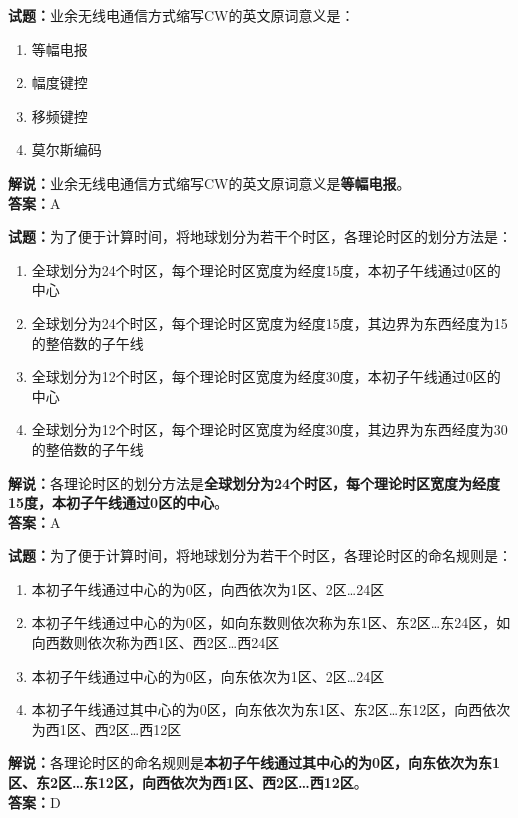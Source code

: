 \documentclass{ctexbook}
\begin{document}
\bigskip


\noindent\textbf{试题：}业余无线电通信方式缩写CW的英文原词意义是：
\begin{enumerate}[leftmargin=3em]
\item 等幅电报
\item 幅度键控
\item 移频键控
\item 莫尔斯编码
\end{enumerate}
\noindent\textbf{解说：}业余无线电通信方式缩写CW的英文原词意义是\textbf{等幅电报}。\\\noindent\textbf{答案：}A



\bigskip


\noindent\textbf{试题：}为了便于计算时间，将地球划分为若干个时区，各理论时区的划分方法是：
\begin{enumerate}[leftmargin=3em]
\item 全球划分为24个时区，每个理论时区宽度为经度15度，本初子午线通过0区的中心
\item 全球划分为24个时区，每个理论时区宽度为经度15度，其边界为东西经度为15的整倍数的子午线
\item 全球划分为12个时区，每个理论时区宽度为经度30度，本初子午线通过0区的中心
\item 全球划分为12个时区，每个理论时区宽度为经度30度，其边界为东西经度为30的整倍数的子午线
\end{enumerate}
\noindent\textbf{解说：}各理论时区的划分方法是\textbf{全球划分为24个时区，每个理论时区宽度为经度15度，本初子午线通过0区的中心}。\\\noindent\textbf{答案：}A



\bigskip


\noindent\textbf{试题：}为了便于计算时间，将地球划分为若干个时区，各理论时区的命名规则是：
\begin{enumerate}[leftmargin=3em]
\item 本初子午线通过中心的为0区，向西依次为1区、2区…24区
\item 本初子午线通过中心的为0区，如向东数则依次称为东1区、东2区…东24区，如向西数则依次称为西1区、西2区…西24区
\item 本初子午线通过中心的为0区，向东依次为1区、2区…24区
\item 本初子午线通过其中心的为0区，向东依次为东1区、东2区…东12区，向西依次为西1区、西2区…西12区
\end{enumerate}
\noindent\textbf{解说：}各理论时区的命名规则是\textbf{本初子午线通过其中心的为0区，向东依次为东1区、东2区…东12区，向西依次为西1区、西2区…西12区}。\\\noindent\textbf{答案：}D
\end{document}
